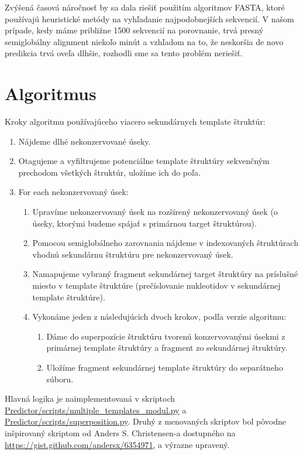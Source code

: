 \indent Zvýšená časová náročnosť by sa dala riešiť použitím algoritmov FASTA, ktoré používajú heuristické metódy na vyhľadanie najpodobnejších sekvencií. V našom prípade, kedy máme približne 1500 sekvencií na porovnanie, trvá presný semiglobálny alignment niekoľo minút a vzhľadom na to, že neskoršia de novo predikcia trvá oveľa dlhšie, rozhodli sme sa tento problém neriešiť.


\section{Algoritmus}
\indent Kroky algoritmu používajúceho viacero sekundárnych template štruktúr:
\begin{enumerate}
\item Nájdeme dlhé nekonzervované úseky.
\item Otagujeme a vyfiltrujeme potenciálne template štruktúry sekvenčným prechodom všetkých štruktúr, uložíme  ich do poľa.
\item For each nekonzervovaný úsek:
\begin{enumerate}
\item Upravíme nekonzervovaný úsek na rozšírený nekonzervovaný úsek (o úseky, ktorými budeme spájať s primárnou target štruktúrou).
\item Pomocou semiglobálneho zarovnania nájdeme v indexovaných štruktúrach vhodnú sekundárnu štruktúru pre nekonzervovaný úsek.
\item Namapujeme vybraný fragment sekundárnej target štruktúry na príslušné miesto v template štruktúre (prečíslovanie nukleotidov v sekundárnej template štruktúre).
\item Vykonáme jeden z následujúcich dvoch krokov, podľa verzie algoritmu:
\begin{enumerate}
\item Dáme do superpozície štruktúru tvorenú konzervovanými úsekmi z primárnej template štruktúry a fragment zo sekundárnej štruktúry.
\item Uložíme fragment sekundárnej template štruktúry do separátneho súboru.
\end{enumerate}
\end{enumerate}
\end{enumerate}


\indent Hlavná logika je naimplementovaná v skriptoch \url{Predictor/scripts/multiple\_templates\_modul.py} a \url{Predictor/scripts/superposition.py}. Druhý z menovaných skriptov bol pôvodne inšpirovaný skriptom od Anders S. Christensen-a dostupného na \url{https://gist.github.com/andersx/6354971}, a výrazne upravený.  


